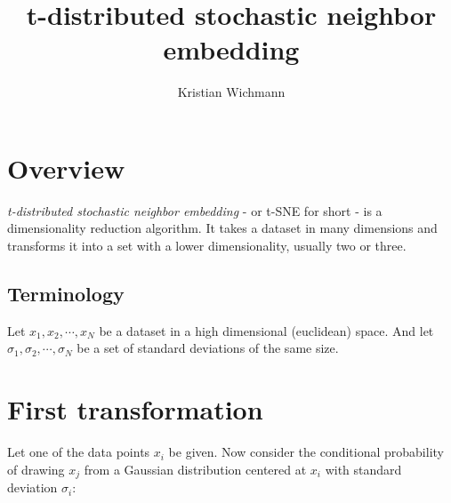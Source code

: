 \documentclass[12pt, a4paper]{article}
\title{t-distributed stochastic neighbor embedding}
\author{Kristian Wichmann}
\numberwithin{equation}{section}
\begin{document}
\maketitle

\section{Overview}
\textit{t-distributed stochastic neighbor embedding} - or t-SNE for short - is a dimensionality reduction algorithm. It takes a dataset in many dimensions and transforms it into a set with a lower dimensionality, usually two or three.

\subsection{Terminology}
Let $x_1, x_2,\cdots, x_N$ be a dataset in a high dimensional (euclidean) space. And let $\sigma_1, \sigma_2,\cdots,\sigma_N$ be a set of standard deviations of the same size.

\section{First transformation}
Let one of the data points $x_i$ be given. Now consider the conditional probability of drawing $x_j$ from a Gaussian distribution centered at $x_i$ with standard deviation $\sigma_i$:
\end{document}
